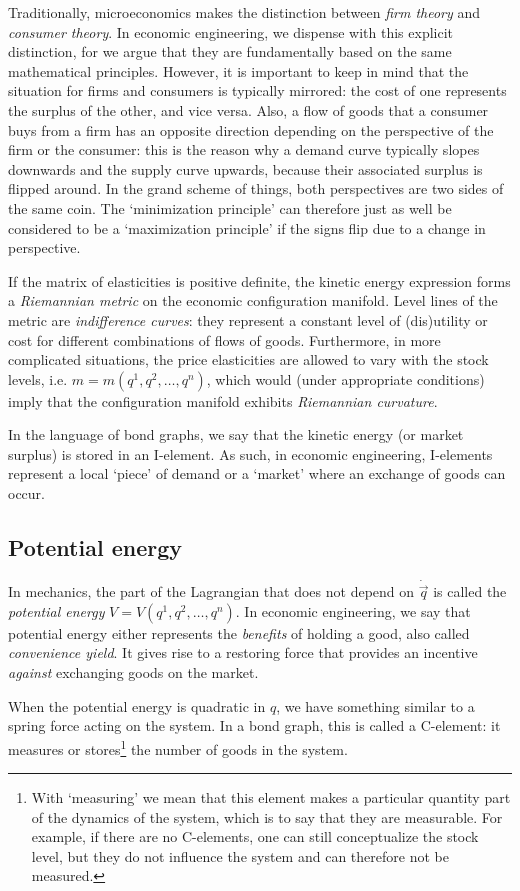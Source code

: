 Traditionally, microeconomics makes the distinction between \emph{firm theory} and \emph{consumer theory}. In economic engineering, we dispense with this explicit distinction, for we argue that they are fundamentally based on the same mathematical principles. However, it is important to keep in mind that the situation for firms and consumers is typically mirrored: the cost of one represents the surplus of the other, and vice versa. Also, a flow of goods that a consumer buys from a firm has an opposite direction depending on the perspective of the firm or the consumer: this is the reason why a demand curve typically slopes downwards and the supply curve upwards, because their associated surplus is flipped around. In the grand scheme of things, both perspectives are two sides of the same coin. The `minimization principle' can therefore just as well be considered to be a `maximization principle' if the signs flip due to a change in perspective.

If the matrix of elasticities is positive definite, the kinetic energy expression forms a \emph{Riemannian metric} on the economic configuration manifold. Level lines of the metric are \emph{indifference curves}: they represent a constant level of (dis)utility or cost for different combinations of flows of goods. Furthermore, in more complicated situations, the price elasticities are allowed to vary with the stock levels, i.e. \( m = m(q^1, q^2, \ldots, q^n)\), which would (under appropriate conditions) imply that the configuration manifold exhibits \emph{Riemannian curvature}.

In the language of bond graphs, we say that the kinetic energy (or market surplus) is stored in an I-element. As such, in economic engineering, I-elements represent a local `piece' of demand or a `market' where an exchange of goods can occur.

\subsection{Potential energy} In mechanics, the part of the Lagrangian that does not depend on \(\dot{\vec{q}}\) is called the \emph{potential energy} \(V = V(q^1, q^2, \ldots, q^n)\). In economic engineering, we say that potential energy either represents the \emph{benefits} of holding a good, also called \emph{convenience yield}. It gives rise to a restoring force that provides an incentive \emph{against} exchanging goods on the market.  

When the potential energy is quadratic in \(q\), we have something similar to a spring force acting on the system. In a bond graph, this is called a C-element: it measures or stores\footnote{With `measuring' we mean that this element makes a particular quantity part of the dynamics of the system, which is to say that they are measurable. For example, if there are no C-elements, one can still conceptualize the stock level, but they do not influence the system and can therefore not be measured.} the number of goods in the system.


